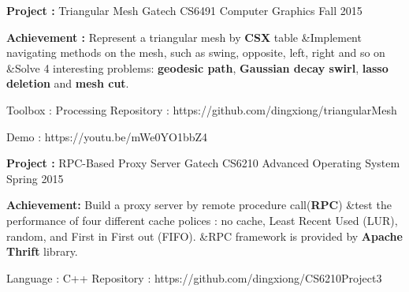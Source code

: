 


\begin{cventries}


\cvproject
{\textbf{Project :} Triangular Mesh} 
{Gatech CS6491 Computer Graphics} 
{Fall 2015}
{
  \begin{cvitems}
  \item {\textbf{Achievement :} Represent a triangular mesh by \textbf{CSX} table \quad\&\quad Implement navigating
      methods on the mesh, such as swing, opposite, left, right and so on
      \quad\&\quad  Solve 4 interesting problems: \textbf{geodesic path}, 
      \textbf{Gaussian decay swirl}, \textbf{lasso deletion} and \textbf{mesh cut}.}
  \item {Toolbox : Processing \quad
      Repository : {\color{black} https://github.com/dingxiong/triangularMesh}
    \item{
      Demo :   {\color{black} https://youtu.be/mWe0YO1bbZ4}}
  }
  \end{cvitems}
}

\cvproject
{\textbf{Project :} RPC-Based Proxy Server} 
{Gatech CS6210 Advanced Operating System} 
{Spring 2015} %
{
  \begin{cvitems}
  \item {\textbf{Achievement:} Build a proxy server by remote procedure call(\textbf{RPC}) 
\quad\&\quad test the performance of four different cache polices : no cache, Least Recent Used (LUR), random,
      and First in First out (FIFO). 
\quad\&\quad RPC framework is provided by \textbf{Apache Thrift} library.
    }
  \item {Language : C++  \quad
      Repository : {\color{black} https://github.com/dingxiong/CS6210Project3}
    }
  \end{cvitems}
}



\end{cventries}
